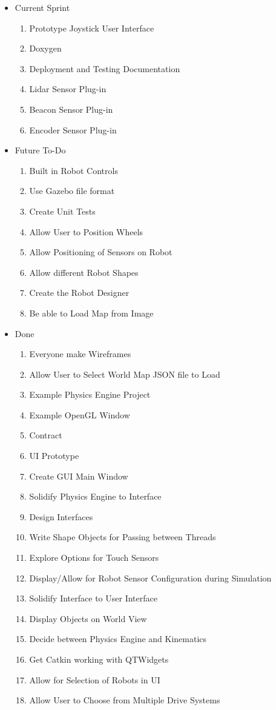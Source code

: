 \begin{itemize}
\item Current Sprint 
\begin{enumerate}
\item Prototype Joystick User Interface
\item Doxygen
\item Deployment and Testing Documentation
\item Lidar Sensor Plug-in
\item Beacon Sensor Plug-in
\item Encoder Sensor Plug-in
\end{enumerate}
\item Future To-Do 
\begin{enumerate}
\item Built in Robot Controls 
\item Use Gazebo file format
\item Create Unit Tests
\item Allow User to Position Wheels
\item Allow Positioning of Sensors on Robot
\item Allow different Robot Shapes
\item Create the Robot Designer
\item Be able to Load Map from Image
\end{enumerate}
\item Done
\begin{enumerate}
\item Everyone make Wireframes
\item Allow User to Select World Map JSON file to Load
\item Example Physics Engine Project
\item Example OpenGL Window
\item Contract
\item UI Prototype
\item Create GUI Main Window
\item Solidify Physics Engine to Interface
\item Design Interfaces
\item Write Shape Objects for Passing between Threads
\item Explore Options for Touch Sensors
\item Display/Allow for Robot Sensor Configuration during Simulation
\item Solidify Interface to User Interface
\item Display Objects on World View
\item Decide between Physics Engine and Kinematics
\item Get Catkin working with QTWidgets
\item Allow for Selection of Robots in UI
\item Allow User to Choose from Multiple Drive Systems
\end{enumerate}
\end{itemize}


